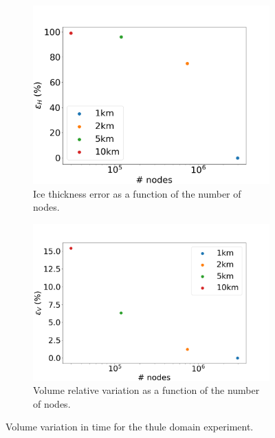 \documentclass{article}
\begin{document}
\begin{figure}[!h]
	\centering
		\begin{subfigure}{.45\textwidth}
		\centering
		\includegraphics[width=1.1\linewidth]{../fig/H_THULE_full_all_res_vs_num_nodes.png}
		\caption{Ice thickness error as a function of the number of nodes.}
		\label{H_THULE_VS_NODES}
	\end{subfigure}
	\begin{subfigure}{.45\textwidth}
		\centering
		\includegraphics[width=1.1\linewidth]{../fig/Volume_THULE_full_all_res_vs_num_nodes.png}
		\caption{Volume relative variation as a function of the number of nodes.}
		\label{VOLUME_THULE_VS_NODES}
	\end{subfigure}
	\caption{Volume variation in time for the thule domain experiment.}
	\label{Volume_THULE_VS_TIME_VS_NODES}
\end{figure}
\end{document}
